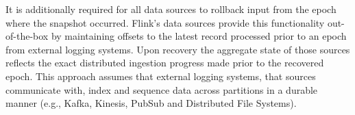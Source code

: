 
It is additionally required for all data sources to rollback input from the epoch where the snapshot occurred. Flink's data sources provide this functionality out-of-the-box by maintaining offsets to the latest record processed prior to an epoch from external logging systems. Upon recovery the aggregate state of those sources reflects the exact distributed ingestion progress made prior to the recovered epoch. This approach assumes that external logging systems, that sources communicate with, index and sequence data across partitions in a durable manner (e.g., Kafka, Kinesis, PubSub and Distributed File Systems). 





